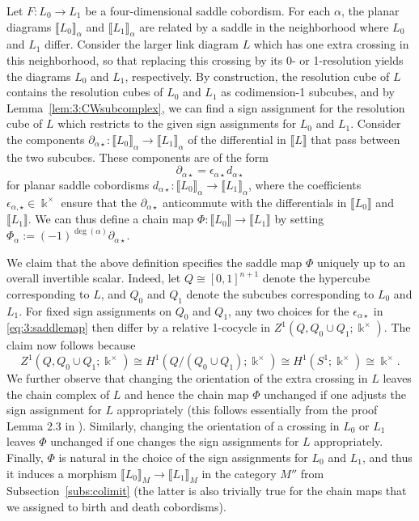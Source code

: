 \documentclass[12pt]{amsart}
\theoremstyle{definition}
\theoremstyle{plain}
\begin{document}
Let $F\colon L_0\rightarrow L_1$ be a four-dimensional saddle cobordism.  For each $\alpha$, the planar diagrams $\llbracket L_0\rrbracket_\alpha$ and $\llbracket L_1\rrbracket_\alpha$ are
related by a saddle in the neighborhood where $L_0$ and $L_1$ differ. 
Consider the larger link diagram $L$ which has one extra crossing in this neighborhood, so that
replacing this crossing by its 0- or 1-resolution yields the diagrams $L_0$ and $L_1$, respectively.
By construction, the resolution cube of $L$ contains the resolution cubes of $L_0$ and $L_1$ as codimension-1 subcubes,
and by Lemma~\ref{lem:3:CWsubcomplex}, we can find a sign assignment for the resolution cube of $L$ which restricts
to the given sign assignments for $L_0$ and $L_1$. Consider the components
$\partial_{\alpha\star}\colon\llbracket L_0\rrbracket_\alpha\rightarrow\llbracket L_1\rrbracket_\alpha$ of the differential in $\llbracket L\rrbracket$ 
that pass between the two subcubes.
These components are of the form
\begin{equation}\label{eq:3:saddlemap}
\partial_{\alpha\star}=\epsilon_{\alpha\star}d_{\alpha\star}
\end{equation}
for planar saddle cobordisms
$d_{\alpha\star}\colon\llbracket L_0\rrbracket_\alpha\rightarrow\llbracket L_1\rrbracket_\alpha$, where the coefficients $\epsilon_{\alpha,\star}\in\Bbbk^\times$ ensure that the $\partial_{\alpha\star}$ anticommute 
with the differentials in $\llbracket L_0\rrbracket$ and $\llbracket L_1\rrbracket$. We can thus define
a chain map  $\Phi\colon\llbracket L_0\rrbracket\rightarrow\llbracket L_1\rrbracket$ by setting $\Phi_\alpha:=(-1)^{\deg(\alpha)}\partial_{\alpha\star}$.

We claim that the above definition specifies the saddle map $\Phi$ uniquely up to an overall invertible scalar. 
Indeed, let $Q\cong [0,1]^{n+1}$ denote the hypercube
corresponding to $L$, and $Q_0$ and $Q_1$ denote the subcubes corresponding
to $L_0$ and $L_1$. For fixed sign assignments on $Q_0$ and $Q_1$,
any two choices
for the $\epsilon_{\alpha\star}$ in \eqref{eq:3:saddlemap} then differ by a relative 1-cocycle in
$Z^1(Q,Q_0\cup Q_1;\Bbbk^\times)$. The claim now follows because
\[
Z^1(Q,Q_0\cup Q_1;\Bbbk^\times)
\cong H^1(Q/(Q_0\cup Q_1);\Bbbk^\times)\cong H^1(S^1;\Bbbk^\times)\cong\Bbbk^\times.
\]
We further observe that changing the orientation of the extra crossing in $L$
leaves the chain complex of $L$ and hence the chain map $\Phi$
unchanged if one adjusts the sign assignment for $L$ appropriately
(this follows essentially from the proof Lemma 2.3 in {\cite{ORS2007}}). Similarly,
changing the orientation of a crossing in $L_0$ or $L_1$ leaves
$\Phi$ unchanged if one changes the sign assignments for $L$ appropriately.
Finally, $\Phi$ is natural in the choice of the sign assignments for $L_0$ and $L_1$,
and thus it induces a morphism $\llbracket L_0\rrbracket_M\rightarrow \llbracket L_1\rrbracket_M$
in the category $M''$ from Subsection~\ref{subs:colimit}
(the latter is also trivially true for the chain maps that we assigned
to birth and death cobordisms).
\end{document}
